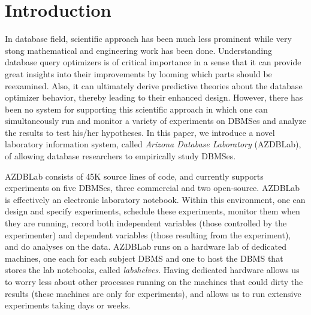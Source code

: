 \documentclass[conference]{IEEEtran}
\begin{document}

\section{Introduction}\label{sec:intro}
In database field, scientific approach has been much less prominent while very stong 
mathematical and engineering work has been done. 
Understanding database query optimizers is of critical importance in a sense that it can provide 
great insights into their improvements by looming which parts should be reexamined. 
Also, it can ultimately derive predictive theories about the database optimizer behavior, thereby leading to their 
enhanced design. 
However, there has been no system for supporting this scientific approach in which one can 
simultaneously run and monitor a variety of experiments on DBMSes and analyze the 
results to test his/her hypotheses. 
In this paper, we introduce a novel laboratory information system, 
called {\em Arizona Database Laboratory} ({\sc AZDBLab}), of 
allowing database researchers to empirically study DBMSes. 

{\sc AZDBLab} consists of 45K source lines of code, and currently supports experiments on five DBMSes, 
three commercial and two open-source. 
 {\sc AZDBLab} is effectively an electronic laboratory notebook. 
Within this environment, one can design and specify experiments, 
schedule these experiments, monitor them when they are running, 
record both independent variables (those controlled by the experimenter) and 
dependent variables (those resulting from the experiment), and do analyses on the data. 
{\sc AZDBLab} runs on a hardware lab of dedicated machines, 
one each for each subject DBMS and one to host the DBMS that stores the lab notebooks, called {\em labshelves}. 
Having dedicated hardware allows us to worry less about other processes running on the machines 
that could dirty the results (these machines are only for experiments), and allows us to run extensive 
experiments taking days or weeks. 
\end{document}
